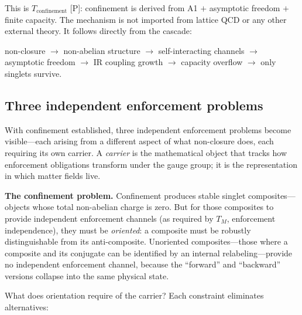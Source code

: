 \documentclass[11pt]{article}
\begin{document}
This is $T_{\mathrm{confinement}}$ [P]: confinement is derived from A1 $+$ asymptotic freedom $+$ finite capacity.  The mechanism is not imported from lattice QCD or any other external theory.  It follows directly from the cascade:
\begin{center}
\small
non-closure $\to$ non-abelian structure $\to$ self-interacting channels $\to$ asymptotic freedom $\to$ IR coupling growth $\to$ capacity overflow $\to$ only singlets survive.
\end{center}


\subsection{Three independent enforcement problems}

With confinement established, three independent enforcement problems become visible---each arising from a different aspect of what non-closure does, each requiring its own carrier.  A \emph{carrier} is the mathematical object that tracks how enforcement obligations transform under the gauge group; it is the representation in which matter fields live.

\textbf{The confinement problem.}  Confinement produces stable singlet composites---objects whose total non-abelian charge is zero.  But for those composites to provide independent enforcement channels (as required by $T_M$, enforcement independence), they must be \emph{oriented}: a composite must be robustly distinguishable from its anti-composite.  Unoriented composites---those where a composite and its conjugate can be identified by an internal relabeling---provide no independent enforcement channel, because the ``forward'' and ``backward'' versions collapse into the same physical state.

What does orientation require of the carrier?  Each constraint eliminates alternatives:
\end{document}
